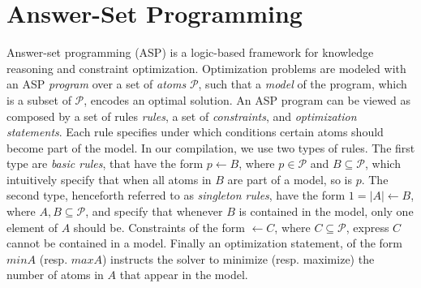 \documentclass[letterpaper]{article} %
\begin{document}
\section{Answer-Set Programming}
Answer-set programming (ASP) \cite{Lifschitz08} is a logic-based framework for knowledge reasoning and constraint optimization. Optimization problems are modeled with an ASP \emph{program} over a set of \emph{atoms} $\mathcal{P}$, such that a \emph{model} of the program, which is a subset of $\mathcal{P}$, encodes an optimal solution. An ASP program can be viewed as composed by a set of rules \emph{rules}, a set of \emph{constraints}, and \emph{optimization statements}.  Each rule specifies under which conditions certain atoms should become part of the model. In our compilation, we use two types of rules. The first type are \emph{basic rules}, that have the form $p\leftarrow B$, where $p\in \mathcal{P}$ and $B\subseteq \mathcal{P}$, which intuitively specify that when all atoms in $B$ are part of a model, so is $p$. The second type, henceforth referred to as \emph{singleton rules}, have the form $1=|A|\leftarrow B$, where $A,B\subseteq \mathcal{P}$, and specify that whenever $B$ is contained in the model, only one element of $A$ should be.
Constraints of the form $\leftarrow C$, where $C\subseteq \mathcal{P}$, express $C$ cannot be contained in a model. Finally an optimization statement, of the form $min A$ (resp. $max A$) instructs the solver to minimize (resp. maximize) the number of atoms in $A$ that appear in the model.
\end{document}
